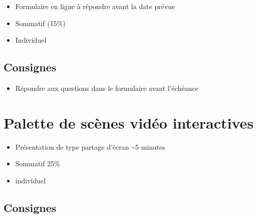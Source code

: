 \documentclass[
  french,
]{book}
\providecommand{\tightlist}{%
  \setlength{\itemsep}{0pt}\setlength{\parskip}{0pt}}
\begin{document}
\begin{itemize}
\tightlist
\item
  Formulaire en ligne à répondre avant la date prévue
\item
  Sommatif (15\%)
\item
  Individuel
\end{itemize}

\hypertarget{consignes-2}{%
\subsection{Consignes}\label{consignes-2}}

\begin{itemize}
\tightlist
\item
  Répondre aux questions dans le formulaire avant l'échéance
\end{itemize}

\hypertarget{sommatif_4}{%
\section{Palette de scènes vidéo interactives}\label{sommatif_4}}

\begin{itemize}
\tightlist
\item
  Présentation de type partage d'écran \textasciitilde5 minutes
\item
  Sommatif 25\%
\item
  individuel
\end{itemize}

\hypertarget{consignes-3}{%
\subsection{Consignes}\label{consignes-3}}
\end{document}
